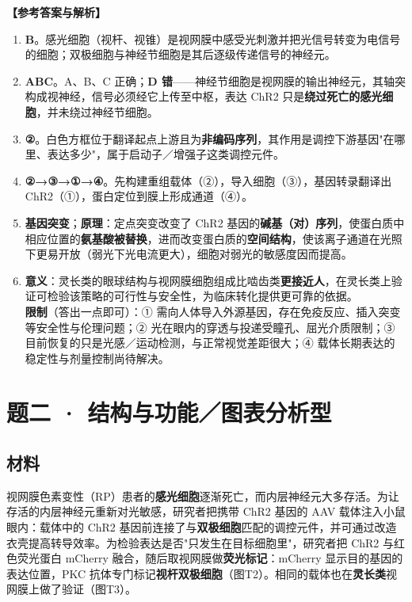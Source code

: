 \documentclass[UTF8,a4paper,11pt]{ctexart}
\newcommand{\ans}{\par\medskip\noindent\textbf{\color{deepblue}【参考答案与解析】}\par\smallskip}
\begin{document}
\ans
\begin{enumerate}[leftmargin=2.1em,itemsep=3pt]
\item \textbf{B}。感光细胞（视杆、视锥）是视网膜中感受光刺激并把光信号转变为电信号的细胞；双极细胞与神经节细胞是其后逐级传递信号的神经元。
\item \textbf{ABC}。A、B、C 正确；\textbf{D 错}——神经节细胞是视网膜的输出神经元，其轴突构成视神经，信号必须经它上传至中枢，表达 ChR2 只是\textbf{绕过死亡的感光细胞}，并未绕过神经节细胞。
\item \textbf{②}。白色方框位于翻译起点上游且为\textbf{非编码序列}，其作用是调控下游基因"在哪里、表达多少"，属于启动子／增强子这类调控元件。
\item \textbf{②→③→①→④}。先构建重组载体（②），导入细胞（③），基因转录翻译出 ChR2（①），蛋白定位到膜上形成通道（④）。
\item \textbf{基因突变}；\textbf{原理}：定点突变改变了 ChR2 基因的\textbf{碱基（对）序列}，使蛋白质中相应位置的\textbf{氨基酸被替换}，进而改变蛋白质的\textbf{空间结构}，使该离子通道在光照下更易开放（弱光下光电流更大），细胞对弱光的敏感度因而提高。
\item \textbf{意义}：灵长类的眼球结构与视网膜细胞组成比啮齿类\textbf{更接近人}，在灵长类上验证可检验该策略的可行性与安全性，为临床转化提供更可靠的依据。\\
\textbf{限制}（答出一点即可）：① 需向人体导入外源基因，存在免疫反应、插入突变等安全性与伦理问题；② 光在眼内的穿透与投递受瞳孔、屈光介质限制；③ 目前恢复的只是光感／运动检测，与正常视觉差距很大；④ 载体长期表达的稳定性与剂量控制尚待解决。
\end{enumerate}

\clearpage
\section{题二 · 结构与功能／图表分析型}

\subsection*{材料}

视网膜色素变性（RP）患者的\textbf{感光细胞}逐渐死亡，而内层神经元大多存活。为让存活的内层神经元重新对光敏感，研究者把携带 ChR2 基因的 AAV 载体注入小鼠眼内：载体中的 ChR2 基因前连接了与\textbf{双极细胞}匹配的调控元件，并可通过改造衣壳提高转导效率。为检验表达是否"只发生在目标细胞里"，研究者把 ChR2 与红色荧光蛋白 mCherry 融合，随后取视网膜做\textbf{荧光标记}：mCherry 显示目的基因的表达位置，PKC 抗体专门标记\textbf{视杆双极细胞}（图T2）。相同的载体也在\textbf{灵长类}视网膜上做了验证（图T3）。
\end{document}
